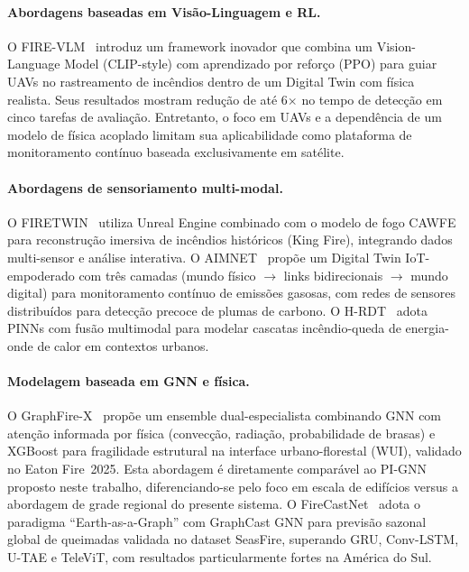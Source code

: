 \documentclass[preprint,times,numbers]{elsarticle}
\begin{document}
\paragraph{Abordagens baseadas em Visão-Linguagem e RL.} O FIRE-VLM~\cite{article:webb2026} introduz um framework inovador que combina um Vision-Language Model (CLIP-style) com aprendizado por reforço (PPO) para guiar UAVs no rastreamento de incêndios dentro de um Digital Twin com física realista. Seus resultados mostram redução de até 6$\times$ no tempo de detecção em cinco tarefas de avaliação. Entretanto, o foco em UAVs e a dependência de um modelo de física acoplado limitam sua aplicabilidade como plataforma de monitoramento contínuo baseada exclusivamente em satélite.

\paragraph{Abordagens de sensoriamento multi-modal.} O FIRETWIN~\cite{article:raha2025} utiliza Unreal Engine combinado com o modelo de fogo CAWFE para reconstrução imersiva de incêndios históricos (King Fire), integrando dados multi-sensor e análise interativa. O AIMNET~\cite{article:aimnet2025} propõe um Digital Twin IoT-empoderado com três camadas (mundo físico $\rightarrow$ links bidirecionais $\rightarrow$ mundo digital) para monitoramento contínuo de emissões gasosas, com redes de sensores distribuídos para detecção precoce de plumas de carbono. O H-RDT~\cite{article:hrdt2025} adota PINNs com fusão multimodal para modelar cascatas incêndio-queda de energia-onde de calor em contextos urbanos.

\paragraph{Modelagem baseada em GNN e física.} O GraphFire-X~\cite{article:esparza2025} propõe um ensemble dual-especialista combinando GNN com atenção informada por física (convecção, radiação, probabilidade de brasas) e XGBoost para fragilidade estrutural na interface urbano-florestal (WUI), validado no Eaton Fire~2025. Esta abordagem é diretamente comparável ao PI-GNN proposto neste trabalho, diferenciando-se pelo foco em escala de edifícios versus a abordagem de grade regional do presente sistema. O FireCastNet~\cite{article:michail2025} adota o paradigma ``Earth-as-a-Graph'' com GraphCast GNN para previsão sazonal global de queimadas validada no dataset SeasFire, superando GRU, Conv-LSTM, U-TAE e TeleViT, com resultados particularmente fortes na América do Sul.
\end{document}
